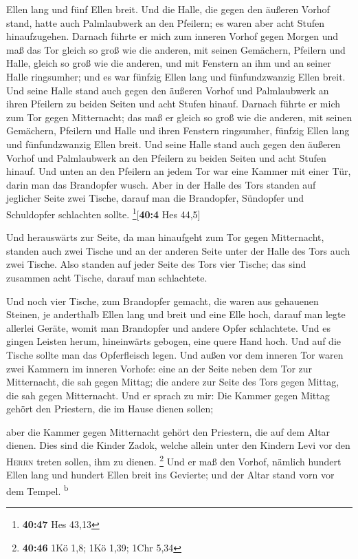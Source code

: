 Ellen lang und fünf Ellen breit.  Und die Halle, die
gegen den äußeren Vorhof stand, hatte auch Palmlaubwerk an den Pfeilern;
es waren aber acht Stufen hinaufzugehen.  Darnach führte
er mich zum inneren Vorhof gegen Morgen und maß das Tor gleich so groß
wie die anderen,  mit seinen Gemächern, Pfeilern und
Halle, gleich so groß wie die anderen, und mit Fenstern an ihm und an
seiner Halle ringsumher; und es war fünfzig Ellen lang und
fünfundzwanzig Ellen breit.  Und seine Halle stand auch
gegen den äußeren Vorhof und Palmlaubwerk an ihren Pfeilern zu beiden
Seiten und acht Stufen hinauf.  Darnach führte er mich
zum Tor gegen Mitternacht; das maß er gleich so groß wie die anderen,
 mit seinen Gemächern, Pfeilern und Halle und ihren
Fenstern ringsumher, fünfzig Ellen lang und fünfundzwanzig Ellen breit.
 Und seine Halle stand auch gegen den äußeren Vorhof und
Palmlaubwerk an den Pfeilern zu beiden Seiten und acht Stufen hinauf.
 Und unten an den Pfeilern an jedem Tor war eine Kammer
mit einer Tür, darin man das Brandopfer wusch.  Aber in
der Halle des Tors standen auf jeglicher Seite zwei Tische, darauf man
die Brandopfer, Sündopfer und Schuldopfer schlachten sollte.
\footnote{\textbf{40:47} Hes 43,13}{[}\textbf{40:4} Hes 44,5{]}

 Und herauswärts zur Seite, da man hinaufgeht zum Tor
gegen Mitternacht, standen auch zwei Tische und an der anderen Seite
unter der Halle des Tors auch zwei Tische.  Also standen
auf jeder Seite des Tors vier Tische; das sind zusammen acht Tische,
darauf man schlachtete.

 Und noch vier Tische, zum Brandopfer gemacht, die waren
aus gehauenen Steinen, je anderthalb Ellen lang und breit und eine Elle
hoch, darauf man legte allerlei Geräte, womit man Brandopfer und andere
Opfer schlachtete.  Und es gingen Leisten herum,
hineinwärts gebogen, eine quere Hand hoch. Und auf die Tische sollte man
das Opferfleisch legen.  Und außen vor dem inneren Tor
waren zwei Kammern im inneren Vorhofe: eine an der Seite neben dem Tor
zur Mitternacht, die sah gegen Mittag; die andere zur Seite des Tors
gegen Mittag, die sah gegen Mitternacht.  Und er sprach
zu mir: Die Kammer gegen Mittag gehört den Priestern, die im Hause
dienen sollen;

 aber die Kammer gegen Mitternacht gehört den Priestern,
die auf dem Altar dienen. Dies sind die Kinder Zadok, welche allein
unter den Kindern Levi vor den \textsc{Herrn} treten sollen, ihm zu
dienen. \footnote{\textbf{40:46} 1Kö 1,8; 1Kö 1,39; 1Chr 5,34}
 Und er maß den Vorhof, nämlich hundert Ellen lang und
hundert Ellen breit ins Gevierte; und der Altar stand vorn vor dem
Tempel. \textsuperscript{b}

